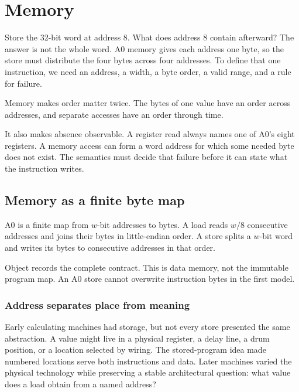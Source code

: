 \chapter{Memory}
\label{ch:memory}

Store the 32-bit word  at address 8. What does address 8
contain afterward? The answer is not the whole word. A0 memory gives each
address one byte, so the store must distribute the four bytes across four
addresses. To define that one instruction, we need an address, a width, a byte
order, a valid range, and a rule for failure.

Memory makes order matter twice. The bytes of one value have an order across
addresses, and separate accesses have an order through time.

It also makes absence observable. A register read always names one of A0's
eight registers. A memory access can form a word address for which some needed
byte does not exist. The semantics must decide that failure before it can
state what the instruction writes.

\section{Memory as a finite byte map}

\begin{definition}[title={A0 data memory}]
A0  is a finite map from \(w\)-bit addresses to bytes. A
load reads \(w/8\) consecutive addresses and joins their bytes in
little-endian order. A store splits a \(w\)-bit word and writes its bytes to
consecutive addresses in that order.
\end{definition}

Object  records the complete contract. This is data memory,
not the immutable program map. An A0 store cannot overwrite instruction bytes
in the first model.

\subsection{Address separates place from meaning}

Early calculating machines had storage, but not every store presented the
same abstraction. A value might live in a physical register, a delay line, a
drum position, or a location selected by wiring. The stored-program idea
made numbered locations serve both instructions and data. Later machines
varied the physical technology while preserving a stable architectural
question: what value does a load obtain from a named address?

